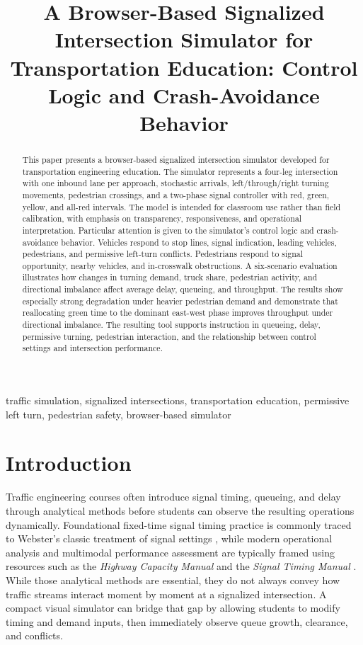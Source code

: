 \documentclass[conference]{IEEEtran}
\title{A Browser-Based Signalized Intersection Simulator for Transportation Education: Control Logic and Crash-Avoidance Behavior}
\author{
\IEEEauthorblockN{Kun Xie}
\IEEEauthorblockA{
Department of Civil and Environmental Engineering\\
Old Dominion University\\
Norfolk, Virginia, USA\\
\texttt{kxie@odu.edu}
}
}
\begin{document}
\maketitle

\begin{abstract}
This paper presents a browser-based signalized intersection simulator developed for transportation engineering education. The simulator represents a four-leg intersection with one inbound lane per approach, stochastic arrivals, left/through/right turning movements, pedestrian crossings, and a two-phase signal controller with red, green, yellow, and all-red intervals. The model is intended for classroom use rather than field calibration, with emphasis on transparency, responsiveness, and operational interpretation. Particular attention is given to the simulator's control logic and crash-avoidance behavior. Vehicles respond to stop lines, signal indication, leading vehicles, pedestrians, and permissive left-turn conflicts. Pedestrians respond to signal opportunity, nearby vehicles, and in-crosswalk obstructions. A six-scenario evaluation illustrates how changes in turning demand, truck share, pedestrian activity, and directional imbalance affect average delay, queueing, and throughput. The results show especially strong degradation under heavier pedestrian demand and demonstrate that reallocating green time to the dominant east-west phase improves throughput under directional imbalance. The resulting tool supports instruction in queueing, delay, permissive turning, pedestrian interaction, and the relationship between control settings and intersection performance.
\end{abstract}

\begin{IEEEkeywords}
traffic simulation, signalized intersections, transportation education, permissive left turn, pedestrian safety, browser-based simulator
\end{IEEEkeywords}

\section{Introduction}
Traffic engineering courses often introduce signal timing, queueing, and delay through analytical methods before students can observe the resulting operations dynamically. Foundational fixed-time signal timing practice is commonly traced to Webster's classic treatment of signal settings \cite{webster1958}, while modern operational analysis and multimodal performance assessment are typically framed using resources such as the \emph{Highway Capacity Manual} and the \emph{Signal Timing Manual} \cite{hcm2016,stm2015}. While those analytical methods are essential, they do not always convey how traffic streams interact moment by moment at a signalized intersection. A compact visual simulator can bridge that gap by allowing students to modify timing and demand inputs, then immediately observe queue growth, clearance, and conflicts.
\end{document}
